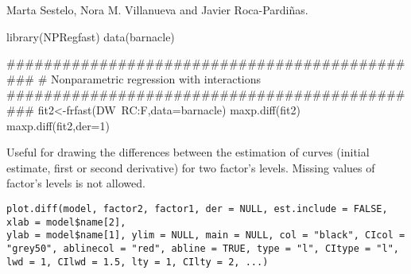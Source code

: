 %
\begin{Author}\relax
Marta Sestelo, Nora M. Villanueva and Javier Roca-Pardiñas.
\end{Author}
%
\begin{Examples}
\begin{ExampleCode}
library(NPRegfast)
data(barnacle)

##############################################
# Nonparametric regression with interactions
##############################################
fit2<-frfast(DW~RC:F,data=barnacle)
maxp.diff(fit2)
maxp.diff(fit2,der=1)
\end{ExampleCode}
\end{Examples}


%
\begin{Description}\relax
Useful for drawing the differences between the estimation of curves (initial estimate, first or second derivative) for  two factor's levels.  Missing values of factor's levels is not allowed. 
\end{Description}
%
\begin{Usage}
\begin{verbatim}
plot.diff(model, factor2, factor1, der = NULL, est.include = FALSE, xlab = model$name[2], 
ylab = model$name[1], ylim = NULL, main = NULL, col = "black", CIcol = "grey50", ablinecol = "red", abline = TRUE, type = "l", CItype = "l", lwd = 1, CIlwd = 1.5, lty = 1, CIlty = 2, ...)
\end{verbatim}
\end{Usage}
%
